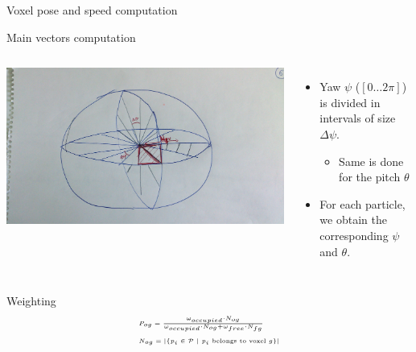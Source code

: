 \begin{frame}[plain]{Voxel pose and speed computation}
  \begin{overlayarea}{\textwidth}{\textheight}
   {
    \vskip-7.5cm
    \begin{block}{Main vectors computation}
      \begin{columns}
	\begin{center}
	  \includegraphics[width=\textwidth]{sphericalHist}\\~\\
	\end{center}
	\begin{itemize}
	  \item Yaw $\psi$ ($[0\dots2\pi]$) is divided in intervals of size $\Delta\psi$.
	  \begin{itemize}
	    \item Same is done for the pitch $\theta$
	  \end{itemize}
	  \item For each particle, we obtain the corresponding $\psi$ and $\theta$.	  
	\end{itemize}
      \end{columns}
    \end{block}
  }
   {
    \vskip-7.0cm
    \begin{block}{Weighting}
      \begin{equation}\label{eq:cp05_total_posterior_probabilities}
	\nonumber \tiny
	\begin{array}{l}
	P_{og}={{\omega_{occupied} \cdot N_{og}} \over {\omega_{occupied} \cdot N_{og} + \omega_{free} \cdot N_{fg}}} \\~\\
	N_{og} = | \{ p_i \in \mathcal{P} ~|~ p_i \text{ belongs to voxel } g \} |
	\end{array}
      \end{equation}

\end{block}}
\end{overlayarea}
\end{frame}
